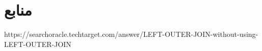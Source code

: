 \documentclass{article}
\begin{document}
\section*{منابع}
\renewcommand{\section}[2]{}%
\begin{thebibliography}{99} %


\begin{LTRitems}

\resetlatinfont

 https://searchoracle.techtarget.com/answer/LEFT-OUTER-JOIN-without-using-LEFT-OUTER-JOIN
\end{LTRitems}

\end{thebibliography}
\end{document}
